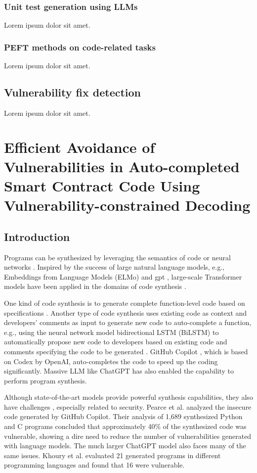 \documentclass[12pt]{book}
\begin{document}
\subsection{Unit test generation using LLMs}
Lorem ipsum dolor sit amet.

\subsection{PEFT methods on code-related tasks}
Lorem ipsum dolor sit amet.

\section{Vulnerability fix detection}
Lorem ipsum dolor sit amet.

\chapter{Efficient Avoidance of Vulnerabilities in Auto-completed Smart Contract Code Using Vulnerability-constrained Decoding}

\section{Introduction}
Programs can be synthesized by leveraging the semantics of code \cite{alon2018code2vec} or neural networks \cite{iyer2018mapping}. Inspired by the success of large natural language models, e.g., Embeddings from Language Models (ELMo) \cite{peters2018deep} and \acrfull{gpt} \cite{radford2018improving}, large-scale Transformer models have been applied in the domains of code synthesis \cite{copilot, alphacode, christopoulou2022pangu}. 

One kind of code synthesis is to generate complete function-level code based on specifications \cite{copilot,alphacode}. Another type of code synthesis uses existing code as context and developers' comments as input to generate new code to auto-complete a function, e.g., using the neural network model bidirectional LSTM (BiLSTM) to automatically propose new code to developers based on existing code and comments specifying the code to be generated \citet{iyer2018mapping}. GitHub Copilot \cite{copilot}, which is based on Codex \cite{chen2021codex} by OpenAI, auto-completes the code to speed up the coding significantly. Massive LLM like ChatGPT \cite{chatgpt} has also enabled the capability to perform program synthesis.

Although state-of-the-art models provide powerful synthesis capabilities, they also have challenges \cite{derner2023safeguards}, especially related to security. Pearce et al. \citet{pearce2021asleep} analyzed the insecure code generated by GitHub Copilot. Their analysis of 1,689 synthesized Python and C programs concluded that approximately 40\% of the synthesized code was vulnerable, showing a dire need to reduce the number of vulnerabilities generated with language models. The much larger ChatGPT model also faces many of the same issues. Khoury et al. \cite{khoury2023secure} evaluated 21 generated programs in different programming languages and found that 16 were vulnerable.
\end{document}
